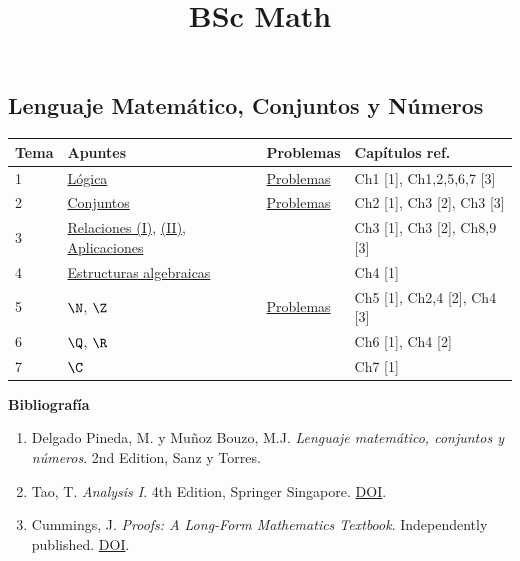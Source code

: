 \title{BSc Math}


\subsection*{Lenguaje Matemático, Conjuntos y Números}

\begin{tabular}{llll}
  \hline
  Tema & Apuntes & Problemas & Capítulos ref. \\
  \hline
  1 & \href{https://drive.google.com/file/d/1xP54XmwVODxb35D40MAR8Evn_ZxfbTml/view?usp=drive_link}{Lógica} & \href{https://drive.google.com/file/d/1fwAt7_KXgk7IXBsx5FyIh8oCAO7IAqtz/view?usp=drive_link}{Problemas} & Ch1 [1], Ch1,2,5,6,7 [3] \\
  2 & \href{https://drive.google.com/file/d/139OjosEXU1lIBBZASTgoQLkOgSOBAONc/view?usp=drive_link}{Conjuntos} & \href{https://drive.google.com/file/d/1PiKGx4DmKc2E_ibqTbNkv4XIxurBYZN_/view?usp=drive_link}{Problemas} & Ch2 [1], Ch3 [2], Ch3 [3] \\
  3 & \href{https://drive.google.com/file/d/1k1PhTcEpQKnU0_4HqpkPKWxzXu3nzq_F/view?usp=drive_link}{Relaciones (I)}, \href{https://drive.google.com/file/d/1vkv7-XjqCUB6NgXZFvEfimytX4ginumX/view?usp=drive_link}{(II)}, \href{https://drive.google.com/file/d/1jqTugT_EVEdAdQ7VGYkqAa9sYIxS9PVr/view?usp=drive_link}{Aplicaciones} & & Ch3 [1], Ch3 [2], Ch8,9 [3] \\
  4 & \href{https://drive.google.com/file/d/1ULtls3GzJLhfdHaUemJnVnIGE-kauFPT/view?usp=drive_link}{Estructuras algebraicas} & & Ch4 [1] \\
  5 & $\N$, \href{https://drive.google.com/file/d/13I4ozBnJHww7J8yrN8_zA8tKNQ3w8Py6/view?usp=drive_link}{$\Z$} & \href{https://drive.google.com/file/d/1CCVdODgvL_xw9uasBl-FANbsNMcn1yyP/view?usp=drive_link}{Problemas} & Ch5 [1], Ch2,4 [2], Ch4 [3] \\
  6 & $\Q$, $\R$ & & Ch6 [1], Ch4 [2] \\
  7 & $\C$ & & Ch7 [1] \\
  \hline
\end{tabular}

\textbf{Bibliografía}

\begin{enumerate}
  \item Delgado Pineda, M. y Muñoz Bouzo, M.J. \emph{Lenguaje matemático, conjuntos y números}. 2nd Edition, Sanz y Torres.
  \item Tao, T. \emph{Analysis I}. 4th Edition, Springer Singapore. \href{https://doi.org/10.1007/978-981-19-7261-4}{DOI}.
  \item Cummings, J. \emph{Proofs: A Long-Form Mathematics Textbook}. Independently published. \href{https://longformmath.com/proofs-book}{DOI}.
\end{enumerate}

